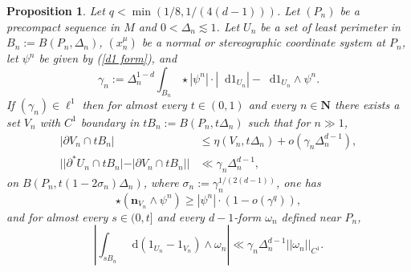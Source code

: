 \documentclass[reqno,10pt]{amsart}
\newcommand{\NN}{\mathbf{N}}
\newcommand*\dif{\mathop{}\!\mathrm{d}}
\newcommand{\normal}{\mathbf n}
\newtheorem{proposition}[theorem]{Proposition}
\theoremstyle{definition}
\numberwithin{equation}{section}
\begin{document}
\begin{proposition}\label{mollifier quant}
Let $q < \min(1/8, 1/(4(d - 1)))$.
Let $(P_n)$ be a precompact sequence in $M$ and $0 < \Delta_n \lesssim 1$.
Let $U_n$ be a set of least perimeter in $B_n := B(P_n, \Delta_n)$, $(x^\mu_n)$ be a normal or stereographic coordinate system at $P_n$, let $\psi^n$ be given by (\ref{d1 form}), and
$$\gamma_n := \Delta_n^{1 - d} \int_{B_n} \star |\psi^n| \cdot |\dif 1_{U_n}| - \dif 1_{U_n} \wedge \psi^n.$$
If $(\gamma_n) \in \ell^1$ then for almost every $t \in (0, 1)$ and every $n \in \NN$ there exists a set $V_n$ with $C^1$ boundary in $tB_n := B(P_n, t\Delta_n)$ such that for $n \gg 1$,
\begin{align}
|\partial V_n \cap tB_n| &\leq \eta(V_n, t\Delta_n) + o(\gamma_n \Delta_n^{d - 1}), \label{mollifier quant1}\\
||\partial^* U_n \cap tB_n| - |\partial V_n \cap tB_n|| &\ll \gamma_n \Delta_n^{d - 1}, \label{mollifier quant2}
\end{align}
on $B(P_n, t(1 - 2\sigma_n)\Delta_n)$, where $\sigma_n := \gamma_n^{1/(2(d - 1))}$, one has
\begin{equation}
\star(\normal_{V_n} \wedge \psi^n) \geq |\psi^n| \cdot (1 - o(\gamma^q)), \label{mollifier quant4}
\end{equation}
and for almost every $s \in (0, t]$ and every $d-1$-form $\omega_n$ defined near $P_n$,
\begin{equation}\label{mollifier quant3}
\left|\int_{sB_n} \dif(1_{U_n} - 1_{V_n}) \wedge \omega_n\right| \ll \gamma_n \Delta_n^{d - 1} ||\omega_n||_{C^1}.
\end{equation}
\end{proposition}
\end{document}
